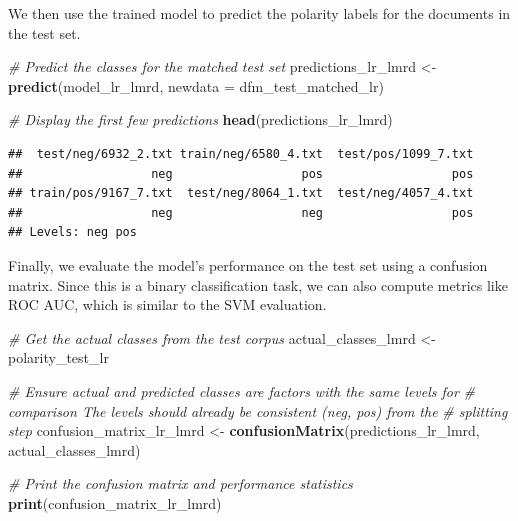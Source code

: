 \documentclass[
]{book}
\newenvironment{Shaded}{\begin{snugshade}}{\end{snugshade}}
\newcommand{\AttributeTok}[1]{\textcolor[rgb]{0.13,0.29,0.53}{#1}}
\newcommand{\CommentTok}[1]{\textcolor[rgb]{0.56,0.35,0.01}{\textit{#1}}}
\newcommand{\FunctionTok}[1]{\textcolor[rgb]{0.13,0.29,0.53}{\textbf{#1}}}
\newcommand{\NormalTok}[1]{#1}
\newcommand{\OtherTok}[1]{\textcolor[rgb]{0.56,0.35,0.01}{#1}}
\begin{document}
We then use the trained model to predict the polarity labels for the documents in the test set.

\begin{Shaded}
\begin{Highlighting}[]
\CommentTok{\# Predict the classes for the matched test set}
\NormalTok{predictions\_lr\_lmrd }\OtherTok{\textless{}{-}} \FunctionTok{predict}\NormalTok{(model\_lr\_lmrd, }\AttributeTok{newdata =}\NormalTok{ dfm\_test\_matched\_lr)}

\CommentTok{\# Display the first few predictions}
\FunctionTok{head}\NormalTok{(predictions\_lr\_lmrd)}
\end{Highlighting}
\end{Shaded}

\begin{verbatim}
##  test/neg/6932_2.txt train/neg/6580_4.txt  test/pos/1099_7.txt 
##                  neg                  pos                  pos 
## train/pos/9167_7.txt  test/neg/8064_1.txt  test/neg/4057_4.txt 
##                  neg                  neg                  pos 
## Levels: neg pos
\end{verbatim}

Finally, we evaluate the model's performance on the test set using a confusion matrix. Since this is a binary classification task, we can also compute metrics like ROC AUC, which is similar to the SVM evaluation.

\begin{Shaded}
\begin{Highlighting}[]
\CommentTok{\# Get the actual classes from the test corpus}
\NormalTok{actual\_classes\_lmrd }\OtherTok{\textless{}{-}}\NormalTok{ polarity\_test\_lr}

\CommentTok{\# Ensure actual and predicted classes are factors with the same levels for}
\CommentTok{\# comparison The levels should already be consistent (\textquotesingle{}neg\textquotesingle{}, \textquotesingle{}pos\textquotesingle{}) from the}
\CommentTok{\# splitting step}
\NormalTok{confusion\_matrix\_lr\_lmrd }\OtherTok{\textless{}{-}} \FunctionTok{confusionMatrix}\NormalTok{(predictions\_lr\_lmrd, actual\_classes\_lmrd)}

\CommentTok{\# Print the confusion matrix and performance statistics}
\FunctionTok{print}\NormalTok{(confusion\_matrix\_lr\_lmrd)}
\end{Highlighting}
\end{Shaded}
\end{document}
